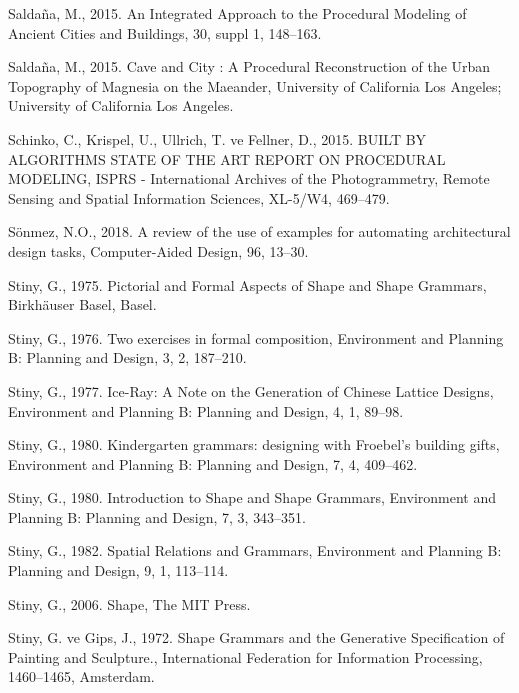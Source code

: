 \documentclass[12pt,turkish,a4paperpaper,]{report}
\begin{document}
\leavevmode\hypertarget{ref-Saldana:2015el}{}%
Saldaña, M., 2015. An Integrated Approach to the Procedural Modeling of
Ancient Cities and Buildings, 30, suppl 1, 148--163.

\leavevmode\hypertarget{ref-Saldana:2015wj}{}%
Saldaña, M., 2015. Cave and City : A Procedural Reconstruction of the
Urban Topography of Magnesia on the Maeander, University of California
Los Angeles; University of California Los Angeles.

\leavevmode\hypertarget{ref-Schinko:2015gn}{}%
Schinko, C., Krispel, U., Ullrich, T. ve Fellner, D., 2015. BUILT BY
ALGORITHMS STATE OF THE ART REPORT ON PROCEDURAL MODELING, ISPRS -
International Archives of the Photogrammetry, Remote Sensing and Spatial
Information Sciences, XL-5/W4, 469--479.

\leavevmode\hypertarget{ref-Sonmez:2018jx}{}%
Sönmez, N.O., 2018. A review of the use of examples for automating
architectural design tasks, Computer-Aided Design, 96, 13--30.

\leavevmode\hypertarget{ref-Stiny:1975fj}{}%
Stiny, G., 1975. Pictorial and Formal Aspects of Shape and Shape
Grammars, Birkhäuser Basel, Basel.

\leavevmode\hypertarget{ref-Stiny:1976im}{}%
Stiny, G., 1976. Two exercises in formal composition, Environment and
Planning B: Planning and Design, 3, 2, 187--210.

\leavevmode\hypertarget{ref-Stiny:1977im}{}%
Stiny, G., 1977. Ice-Ray: A Note on the Generation of Chinese Lattice
Designs, Environment and Planning B: Planning and Design, 4, 1, 89--98.

\leavevmode\hypertarget{ref-Stiny:1980kq}{}%
Stiny, G., 1980. Kindergarten grammars: designing with Froebel's
building gifts, Environment and Planning B: Planning and Design, 7, 4,
409--462.

\leavevmode\hypertarget{ref-Stiny:1980it}{}%
Stiny, G., 1980. Introduction to Shape and Shape Grammars, Environment
and Planning B: Planning and Design, 7, 3, 343--351.

\leavevmode\hypertarget{ref-Stiny:1982cn}{}%
Stiny, G., 1982. Spatial Relations and Grammars, Environment and
Planning B: Planning and Design, 9, 1, 113--114.

\leavevmode\hypertarget{ref-Stiny:2006tq}{}%
Stiny, G., 2006. Shape, The MIT Press.

\leavevmode\hypertarget{ref-Stiny:1972tt}{}%
Stiny, G. ve Gips, J., 1972. Shape Grammars and the Generative
Specification of Painting and Sculpture., International Federation for
Information Processing, 1460--1465, Amsterdam.
\end{document}
